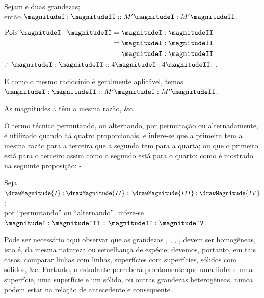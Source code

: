 \documentclass[booklanguage=brazilian]{byrnebook}
\begin{document}
\begin{center}
Sejam  e  duas grandezas;\\
então $\magnitudeI : \magnitudeII :: M' \magnitudeI : M' \magnitudeII$.

$\begin{aligned}
\mbox{Pois } \magnitudeI : \magnitudeII &= \magnitudeI : \magnitudeII \\
&= \magnitudeI : \magnitudeII \\
&= \magnitudeI : \magnitudeII \\
\end{aligned}$\\
$\therefore \magnitudeI : \magnitudeII :: 4 \magnitudeI : 4 \magnitudeII$. .

E como o mesmo raciocínio é geralmente aplicável, temos\\
$\magnitudeI : \magnitudeII :: M' \magnitudeI : M' \magnitudeII$.

As magnitudes $\therefore$ têm a mesma razão, \&c.
\end{center}

\vfill\pagebreak

\label{def:V.XIII}
O termo técnico permutando, ou alternando, por permutação ou alternadamente, é utilizado quando há quatro proporcionais, e infere-se que a primeira tem a mesma razão para a terceira que a segunda tem para a quarta; ou que o primeiro está para o terceiro assim como o segundo está para o quarto: como é mostrado na seguinte proposição: -

\begin{center}
Seja $\drawMagnitude{I} : \drawMagnitude{II} :: \drawMagnitude{III} : \drawMagnitude{IV}$;\\
por \enquote{permutando} ou \enquote{alternando}, infere-se\\
$\magnitudeI : \magnitudeIII :: \magnitudeII : \magnitudeIV$.
\end{center}

Pode ser necessário aqui observar que as grandezas \magnitudeI, \magnitudeII, \magnitudeIII, \magnitudeIV, devem ser homogêneas, isto é, da mesma natureza ou semelhança de espécie; devemos, portanto, em tais casos, comparar linhas com linhas, superfícies com superfícies, sólidos com sólidos, \&c. Portanto, o estudante perceberá prontamente que uma linha e uma superfície, uma superfície e um sólido, ou outras grandezas heterogêneas, nunca podem estar na relação de antecedente e consequente.
\end{document}
